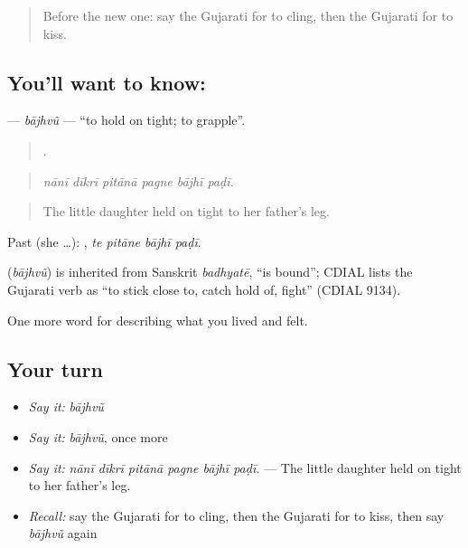 \label{lesson:GU-C451-bajhvu}



\begin{quote}
Before the new one: say the Gujarati for to cling, then the Gujarati for to kiss.
\end{quote}

\subsection*{You'll want to know: }
\textbf{} — \emph{bājhvũ} — \textquotedblleft{}to hold on tight; to grapple\textquotedblright{}.

\begin{quote}
     .
\end{quote}

\begin{quote}
\emph{nānī dīkrī pitānā pagne bājhī paḍī.}
\end{quote}

\begin{quote}
The little daughter held on tight to her father's leg.
\end{quote}

Past (she …):    , \emph{te pitāne bājhī paḍī}.

\begin{cousinweb}
\textbf{} (\emph{bājhvũ}) is inherited from Sanskrit \emph{badhyatē}, \textquotedblleft{}is bound\textquotedblright{}; CDIAL lists the Gujarati verb as \textquotedblleft{}to stick close to, catch hold of, fight\textquotedblright{} (CDIAL 9134).
\end{cousinweb}

\begin{grammarlens}[title={What you've built}]
One more word for describing what you lived and felt.
\end{grammarlens}

\subsection*{Your turn}
\begin{itemize}
\raggedright
  \item \emph{Say it:} \emph{bājhvũ}
  \item \emph{Say it:} \emph{bājhvũ}, once more
  \item \emph{Say it:} \emph{nānī dīkrī pitānā pagne bājhī paḍī.} — The little daughter held on tight to her father's leg.
  \item \emph{Recall:} say the Gujarati for to cling, then the Gujarati for to kiss, then say \emph{bājhvũ} again
\end{itemize}

